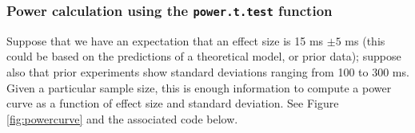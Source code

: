 \documentclass[
  12pt,
]{krantz}
\theoremstyle{definition}
\theoremstyle{definition}
\theoremstyle{definition}
\theoremstyle{definition}
\theoremstyle{remark}
\begin{document}
\hypertarget{power-calculation-using-the-power.t.test-function}{%
\subsubsection{\texorpdfstring{Power calculation using the \texttt{power.t.test} function}{Power calculation using the power.t.test function}}\label{power-calculation-using-the-power.t.test-function}}

Suppose that we have an expectation that an effect size is 15 ms \(\pm 5\) ms (this could be based on the predictions of a theoretical model, or prior data); suppose also that prior experiments show standard deviations ranging from 100 to 300 ms. Given a particular sample size, this is enough information to compute a power curve as a function of effect size and standard deviation. See Figure \ref{fig:powercurve} and the associated code below.
\end{document}
